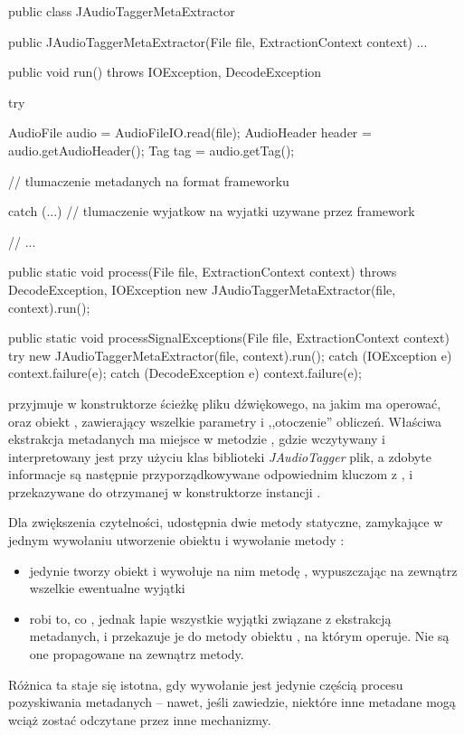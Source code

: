 \begin{java}
public class JAudioTaggerMetaExtractor {

    public JAudioTaggerMetaExtractor(File file, ExtractionContext context) { ... }

    public void run() throws IOException, DecodeException {
        try {
            AudioFile audio = AudioFileIO.read(file);
            AudioHeader header = audio.getAudioHeader();
            Tag tag = audio.getTag();

            // tlumaczenie metadanych na format frameworku
        } catch (...) {
            // tlumaczenie wyjatkow na wyjatki uzywane przez framework
        }
    }

    // ...

    public static void process(File file, ExtractionContext context) throws DecodeException, 
            IOException {
        new JAudioTaggerMetaExtractor(file, context).run();
    }

    public static void processSignalExceptions(File file, ExtractionContext context) {
        try {
            new JAudioTaggerMetaExtractor(file, context).run();
        } catch (IOException e) {
            context.failure(e);
        } catch (DecodeException e) {
            context.failure(e);
        }
    }
}
\end{java}


 przyjmuje w konstruktorze ścieżkę pliku dźwiękowego, na jakim ma
operować, oraz obiekt , zawierający wszelkie parametry i ,,otoczenie''
obliczeń. Właściwa ekstrakcja metadanych ma miejsce w metodzie , gdzie wczytywany i
interpretowany jest przy użyciu klas biblioteki \emph{JAudioTagger} plik, a zdobyte informacje są
następnie przyporządkowywane odpowiednim kluczom z , i przekazywane do
otrzymanej w konstruktorze instancji .

Dla zwiększenia czytelności,  udostępnia dwie metody statyczne,
zamykające w jednym wywołaniu utworzenie obiektu i wywołanie metody :

\begin{itemize}

  \item {} jedynie tworzy obiekt  i wywołuje na nim
    metodę , wypuszczając na zewnątrz wszelkie ewentualne wyjątki

  \item {} robi to, co , jednak łapie wszystkie wyjątki
    związane z ekstrakcją metadanych, i przekazuje je do metody  obiektu
    , na którym operuje. Nie są one propagowane na zewnątrz metody.

\end{itemize}

Różnica ta staje się istotna, gdy wywołanie jest jedynie częścią procesu pozyskiwania metadanych --
nawet, jeśli  zawiedzie, niektóre inne metadane mogą wciąż zostać
odczytane przez inne mechanizmy. 

